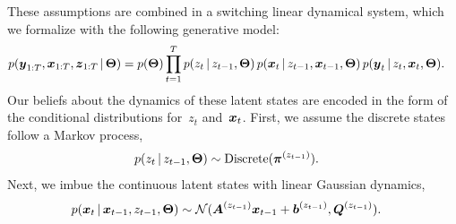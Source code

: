 \documentclass{article}
\begin{document}

These assumptions
are combined in a switching linear dynamical system, which we formalize 
with the following generative model:
\begin{align}
  \label{eq:joint}
  p(\boldsymbol{y}_{1:T}, \boldsymbol{x}_{1:T}, \boldsymbol{z}_{1:T} \,|\, \boldsymbol{\Theta}) &= 
  p(\boldsymbol{\Theta})
  \prod_{t=1}^T
  p(z_t \,|\, z_{t-1}, \boldsymbol{\Theta}) \, 
  p(\boldsymbol{x}_t \,|\, z_{t-1}, \boldsymbol{x}_{t-1}, \boldsymbol{\Theta}) \, 
  p(\boldsymbol{y}_t \,|\, z_t, \boldsymbol{x}_t, \boldsymbol{\Theta}).
\end{align}
Our beliefs about the dynamics of these latent states are encoded in the 
form of the conditional distributions for~$z_t$ and~$\boldsymbol{x}_t$. First,
we assume the discrete states follow a Markov process,
\begin{align}
  p(z_t \,|\, z_{t-1}, \boldsymbol{\Theta}) &\sim \mathrm{Discrete}(\boldsymbol{\pi}^{(z_{t-1})}).
\end{align}
Next, we imbue the continuous latent states with linear Gaussian dynamics,
\begin{align}
  p(\boldsymbol{x}_t \,|\, \boldsymbol{x}_{t-1}, z_{t-1}, \boldsymbol{\Theta}) 
  &\sim \mathcal{N}(\boldsymbol{A}^{(z_{t-1})} \boldsymbol{x}_{t-1} + \boldsymbol{b}^{(z_{t-1})}, \boldsymbol{Q}^{(z_{t-1})}).
\end{align}
\end{document}
